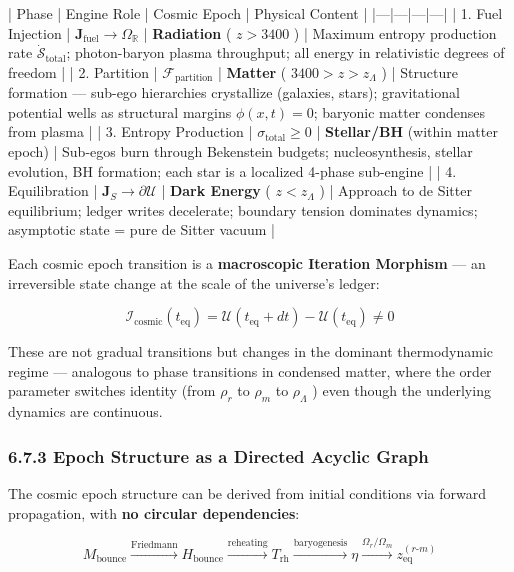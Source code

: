 \documentclass[11pt,a4paper]{article}
\theoremstyle{definition}
\theoremstyle{remark}
\begin{document}
| Phase | Engine Role | Cosmic Epoch | Physical Content |
|---|---|---|---|
| 1. Fuel Injection | $\mathbf{J}_{\text{fuel}} \to \Omega_{\mathbb{R}}$ | \textbf{Radiation} ( $z > 3400$ ) | Maximum entropy production rate $\dot{\mathcal{S}}_{\text{total}}$; photon-baryon plasma throughput; all energy in relativistic degrees of freedom |
| 2. Partition | $\mathcal{F}_{\text{partition}}$ | \textbf{Matter} ( $3400 > z > z_{\Lambda}$ ) | Structure formation — sub-ego hierarchies crystallize (galaxies, stars); gravitational potential wells as structural margins $\phi(x,t) = 0$; baryonic matter condenses from plasma |
| 3. Entropy Production | $\sigma_{\text{total}} \ge 0$ | \textbf{Stellar/BH} (within matter epoch) | Sub-egos burn through Bekenstein budgets; nucleosynthesis, stellar evolution, BH formation; each star is a localized 4-phase sub-engine |
| 4. Equilibration | $\mathbf{J}_S \to \partial\mathcal{U}$ | \textbf{Dark Energy} ( $z < z_\Lambda$ ) | Approach to de Sitter equilibrium; ledger writes decelerate; boundary tension dominates dynamics; asymptotic state = pure de Sitter vacuum |

Each cosmic epoch transition is a \textbf{macroscopic Iteration Morphism} — an irreversible state change at the scale of the universe's ledger:


\begin{equation}
\mathcal{I}_{\text{cosmic}}(t_{\text{eq}}) = \mathcal{U}(t_{\text{eq}} + dt) - \mathcal{U}(t_{\text{eq}}) \ne 0
\end{equation}


These are not gradual transitions but changes in the dominant thermodynamic regime — analogous to phase transitions in condensed matter, where the order parameter switches identity (from $\rho_r$ to $\rho_m$ to $\rho_\Lambda$ ) even though the underlying dynamics are continuous.

\subsubsection{6.7.3 Epoch Structure as a Directed Acyclic Graph}

The cosmic epoch structure can be derived from initial conditions via forward propagation, with \textbf{no circular dependencies}:


\begin{equation}
\boxed{M_{\text{bounce}} \xrightarrow{\text{Friedmann}} H_{\text{bounce}} \xrightarrow{\text{reheating}} T_{\text{rh}} \xrightarrow{\text{baryogenesis}} \eta \xrightarrow{\Omega_r/\Omega_m} z_{\text{eq}}^{(r\text{-}m)}}
\end{equation}
\end{document}
